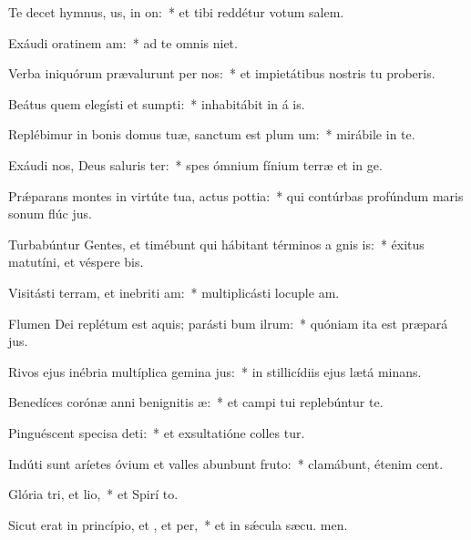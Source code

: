\item Te decet hymnus, us, in on:~* et tibi reddétur votum  salem.
\item Exáudi oratinem am:~* ad te omnis  niet.
\item Verba iniquórum prævalurunt per nos:~* et impietátibus nostris tu proberis.
\item Beátus quem elegísti et sumpti:~* inhabitábit in á is.
\item Replébimur in bonis domus tuæ, sanctum est plum um:~* mirábile in te.
\item Exáudi nos, Deus saluris ter:~* spes ómnium fínium terræ et in  ge.
\item Prǽparans montes in virtúte tua, actus pottia:~* qui contúrbas profúndum maris sonum flúc jus.
\item Turbabúntur Gentes, et timébunt qui hábitant términos a gnis is:~* éxitus matutíni, et véspere bis.
\item Visitásti terram, et inebriti am:~* multiplicásti locuple am.
\item Flumen Dei replétum est aquis; parásti bum ilrum:~* quóniam ita est præpará jus.
\item Rivos ejus inébria multíplica gemina jus:~* in stillicídiis ejus lætá minans.
\item Benedíces corónæ anni benignitis æ:~* et campi tui replebúntur te.
\item Pinguéscent specisa deti:~* et exsultatióne colles tur.
\item Indúti sunt aríetes óvium et valles abunbunt fruto:~* clamábunt, étenim  cent.
\item Glória tri, et lio,~* et Spirí to.
\item Sicut erat in princípio, et , et per,~* et in sǽcula sæcu. men.
